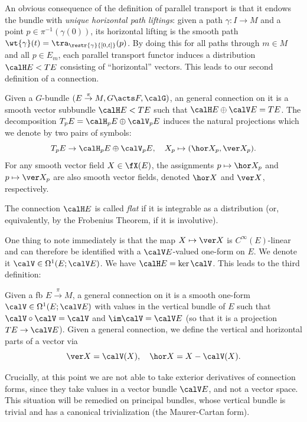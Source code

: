 An obvious consequence of the definition of parallel transport is that it endows the bundle with \emph{unique horizontal path liftings}: given a path $\gamma:I\to M$ and a point $p\in\pi^{-1}(\gamma(0))$, its horizontal lifting is the smooth path $\wt{\gamma}(t)=\tra_{\restr{\gamma}{[0,t]}}(p)$. By doing this for all paths through $m\in M$ and all $p\in E_m$, each parallel transport functor induces a distribution $\calH E<TE$ consisting of ``horizontal'' vectors. This leads to our second definition of a connection.


\begin{defn}
    Given a $G$-bundle $(E\overset{\pi}{\to}M,G\acts F,\calG)$, an general connection on it is a smooth vector subbundle $\calH E<TE$ such that $\calH E\oplus \calV E=TE$. The decomposition $T_pE=\calH_pE\oplus \calV_pE$ induces the natural projections which we denote by two pairs of symbols:
    \[T_pE\to \calH_pE\oplus \calV_pE,\quad X_p\mapsto (\hor X_p,\ver X_p).\]
    For any smooth vector field $X\in\fX(E)$, the assignments $p\mapsto \hor X_p$ and $p\mapsto \ver X_p$ are also smooth vector fields, denoted $\hor X$ and $\ver X$, respectively.

    The connection $\calH E$ is called \emph{flat} if it is integrable as a distribution (or, equivalently, by the Frobenius Theorem, if it is involutive).
\end{defn}


One thing to note immediately is that the map $X\mapsto \ver X$ is  $C^\infty(E)$-linear and can therefore be identified with a $\calV E$-valued one-form on $E$. We denote it $\calV\in\Omega^1(E;\calV E)$. We have $\calH E=\ker \calV$. This leads to the third definition:

\begin{defn}
    Given a \gls{fb} $E\overset{\pi}{\to}M$, a general connection on it is a smooth one-form $\calV\in\Omega^1(E;\calV E)$ with values in the vertical bundle of $E$ such that $\calV\circ\calV=\calV$ and $\im\calV=\calV E$ (so that it is a projection $TE\to \calV E$). Given a general connection, we define the vertical and horizontal parts of a vector via
    \[\ver X=\calV(X),\quad \hor X=X-\calV(X).\]
\end{defn}

\begin{xca}
    Crucially, at this point we are not able to take exterior derivatives of connection forms, since they take values in a vector bundle $\calV E$, and not a vector space. This situation will be remedied on principal bundles, whose vertical bundle is trivial and has a canonical trivialization (the Maurer-Cartan form).
\end{xca}

